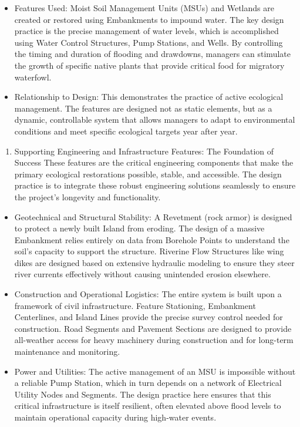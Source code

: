 \documentclass[
  letterpaper,
  DIV=11,
  numbers=noendperiod]{scrreprt}
\providecommand{\tightlist}{%
  \setlength{\itemsep}{0pt}\setlength{\parskip}{0pt}}
\begin{document}
\begin{itemize}
  \begin{itemize}
  \item
    Features Used: Moist Soil Management Units (MSUs) and Wetlands are
    created or restored using Embankments to impound water. The key
    design practice is the precise management of water levels, which is
    accomplished using Water Control Structures, Pump Stations, and
    Wells. By controlling the timing and duration of flooding and
    drawdowns, managers can stimulate the growth of specific native
    plants that provide critical food for migratory waterfowl.
  \item
    Relationship to Design: This demonstrates the practice of active
    ecological management. The features are designed not as static
    elements, but as a dynamic, controllable system that allows managers
    to adapt to environmental conditions and meet specific ecological
    targets year after year.
  \end{itemize}
\end{itemize}

\begin{enumerate}
\def\labelenumi{\arabic{enumi}.}
\setcounter{enumi}{1}
\tightlist
\item
  Supporting Engineering and Infrastructure Features: The Foundation of
  Success These features are the critical engineering components that
  make the primary ecological restorations possible, stable, and
  accessible. The design practice is to integrate these robust
  engineering solutions seamlessly to ensure the project's longevity and
  functionality.
\end{enumerate}

\begin{itemize}
\item
  Geotechnical and Structural Stability: A Revetment (rock armor) is
  designed to protect a newly built Island from eroding. The design of a
  massive Embankment relies entirely on data from Borehole Points to
  understand the soil's capacity to support the structure. Riverine Flow
  Structures like wing dikes are designed based on extensive hydraulic
  modeling to ensure they steer river currents effectively without
  causing unintended erosion elsewhere.
\item
  Construction and Operational Logistics: The entire system is built
  upon a framework of civil infrastructure. Feature Stationing,
  Embankment Centerlines, and Island Lines provide the precise survey
  control needed for construction. Road Segments and Pavement Sections
  are designed to provide all-weather access for heavy machinery during
  construction and for long-term maintenance and monitoring.
\item
  Power and Utilities: The active management of an MSU is impossible
  without a reliable Pump Station, which in turn depends on a network of
  Electrical Utility Nodes and Segments. The design practice here
  ensures that this critical infrastructure is itself resilient, often
  elevated above flood levels to maintain operational capacity during
  high-water events.
\end{itemize}
\end{document}
